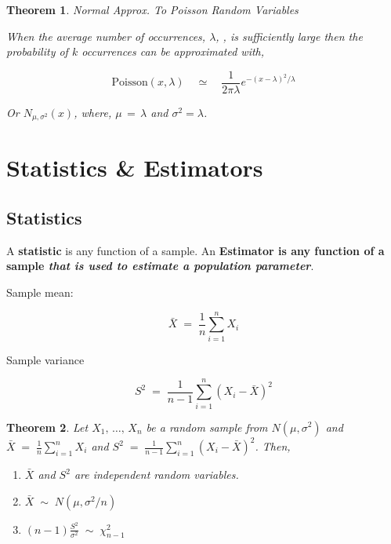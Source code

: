 \documentclass[10pt]{article}
\newtheorem{theorem}{Theorem}
\numberwithin{equation}{section}
\begin{document}
\vspace{3mm}

\begin{theorem}{Normal Approx. To Poisson Random Variables}

When the average number of occurrences, $\lambda$, , is sufficiently large then the probability of $k$ occurrences can be approximated with,

\begin{equation}
\text{Poisson}(x,\lambda) \quad \simeq \quad  \frac{1}{2 \pi \lambda} e^{-(x-\lambda)^{2} / \lambda}
\end{equation}

\noindent
Or $N_{\mu, \sigma^{2}}(x)$, where, $\mu \, = \, \lambda$ and $\sigma^{2} = \lambda$.
\end{theorem}


\section{Statistics \& Estimators}

\subsection{Statistics}

A \textbf{statistic} is any function of a sample.  An \textbf{Estimator is any function of a sample \textit{that is used to estimate a population parameter}}.  

\vspace{2mm}

\noindent
Sample mean:

$$ \bar{X} \; = \; \frac{1}{n} \sum_{i=1}^{n} X_i$$

\noindent
Sample variance

$$ S^{2} \; = \;  \frac{1}{n-1} \sum_{i=1}^{n} (X_i - \bar{X})^{2}$$

\noindent
\begin{theorem}
Let $X_1, \, \ldots, \, X_n$ be a random sample from $N(\mu, \sigma^{2})$ and $ \bar{X} \; = \; \frac{1}{n} \sum_{i=1}^{n} X_i$ and
$ S^{2} \; = \;  \frac{1}{n-1} \sum_{i=1}^{n} (X_i - \bar{X})^{2}$.  Then, 

\begin{enumerate}
\item $ \bar{X}$ and $ S^{2}$ are independent random variables.
\item $\bar{X} \; \sim \; N(\mu, \sigma^{2}/n)$
\item $(n-1) \frac{S^{2}}{\sigma^{2}} \; \sim \; \chi^{2}_{n-1}$
\end{enumerate}

\end{theorem}
\end{document}
